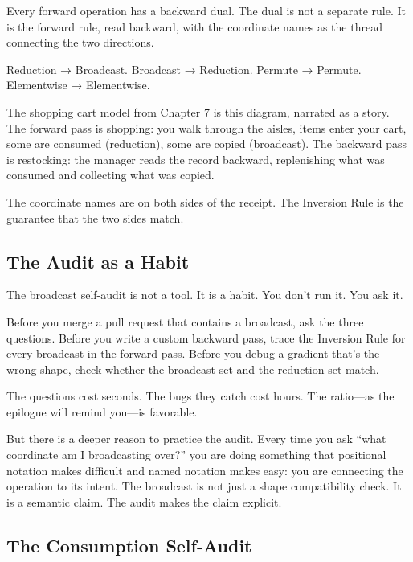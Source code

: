 \documentclass[11pt,titlepage]{article}
\begin{document}
Every forward operation has a backward dual. The dual is not a separate
rule. It is the forward rule, read backward, with the coordinate names
as the thread connecting the two directions.

Reduction → Broadcast. Broadcast → Reduction. Permute → Permute.
Elementwise → Elementwise.

The shopping cart model from Chapter 7 is this diagram, narrated as a
story. The forward pass is shopping: you walk through the aisles, items
enter your cart, some are consumed (reduction), some are copied
(broadcast). The backward pass is restocking: the manager reads the
record backward, replenishing what was consumed and collecting what was
copied.

The coordinate names are on both sides of the receipt. The Inversion
Rule is the guarantee that the two sides match.

\vspace{2em}

\hypertarget{the-audit-as-a-habit}{%
\subsection{The Audit as a Habit}\label{the-audit-as-a-habit}}

The broadcast self-audit is not a tool. It is a habit. You don't run it.
You ask it.

Before you merge a pull request that contains a broadcast, ask the three
questions. Before you write a custom backward pass, trace the Inversion
Rule for every broadcast in the forward pass. Before you debug a
gradient that's the wrong shape, check whether the broadcast set and the
reduction set match.

The questions cost seconds. The bugs they catch cost hours. The
ratio---as the epilogue will remind you---is favorable.

But there is a deeper reason to practice the audit. Every time you ask
``what coordinate am I broadcasting over?'' you are doing something that
positional notation makes difficult and named notation makes easy: you
are connecting the operation to its intent. The broadcast is not just a
shape compatibility check. It is a semantic claim. The audit makes the
claim explicit.

\vspace{2em}

\hypertarget{the-consumption-self-audit}{%
\subsection{The Consumption
Self-Audit}\label{the-consumption-self-audit}}
\end{document}
